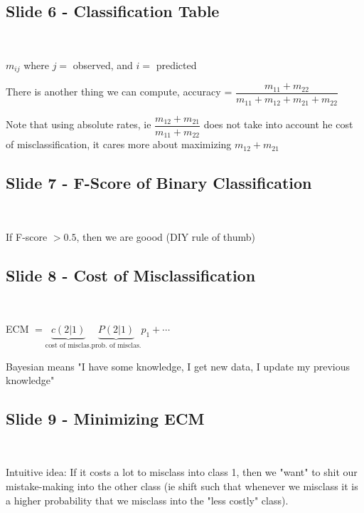 \subsection{Slide 6 - Classification Table}\hfill\\\par
\noindent $m_{ij}$ where $j = $ observed, and $i = $ predicted
\par\bigskip
\noindent There is another thing we can compute, accuracy = $\dfrac{m_{11}+m_{22}}{m_{11}+m_{12}+m_{21}+m_{22}}$
\par\bigskip
\noindent Note that using absolute rates, ie $\dfrac{m_{12}+m_{21}}{m_{11}+m_{22}}$ does not take into account he cost of misclassification, it cares more about maximizing $m_{12}+m_{21}$ 
\par\bigskip
\subsection{Slide 7 - F-Score of Binary Classification}\hfill\\\par
\noindent If F-score $>0.5$, then we are goood (DIY rule of thumb)
\par\bigskip
\subsection{Slide 8 - Cost of Misclassification}\hfill\\\par
\noindent ECM $ = \underbrace{c(2|1)}_{\text{cost of misclas.}}\underbrace{P(2|1)}_{\text{prob. of misclas.}}p_1+\cdots$
\par\bigskip
\noindent Bayesian means "I have some knowledge, I get new data, I update my previous knowledge"
\par\bigskip
\subsection{Slide 9 - Minimizing ECM}\hfill\\\par
\noindent Intuitive idea: If it costs a lot to misclass into class 1, then we "want" to shit our mistake-making into the other class (ie shift such that whenever we misclass it is a higher probability that we misclass into the "less costly" class).
\par\bigskip
